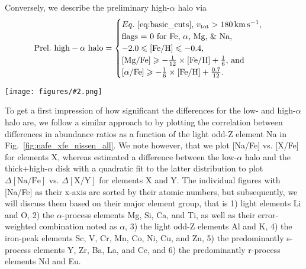 \documentclass[fleqn,usenatbib]{mnras}
\newcommand{\codeicon}{{\faCloudDownload}}
\newcommand{\codelink}[1]{\href{https://github.com/svenbuder/Accreted-stars-in-GALAH-DR3/tree/main/figures/#1.ipynb}{\codeicon}\,\,}
\newcommand{\oscaption}[2]{\caption{#2 \codelink{#1}}}
\newcommand{\figuretextwidth}[4]{\begin{figure*} \centering \texttt{[image: figures/\#2.png]}\oscaption{#3}{#4}\label{fig:#2} \end{figure*}}
\begin{document}
Conversely, we describe the preliminary high-$\alpha$ halo via
\begin{equation} \label{eq:prelim_high_alpha_halo}
\mathrm{Prel.~high-\alpha~halo} =
\begin{cases}
Eq.~\ref{eq:basic_cuts}\text{, } v_\text{tot} > 180\,\mathrm{km\,s^{-1}} \text{, } \\
\text{flags = 0 for Fe, }\alpha\text{, Mg, \& Na, } \\
-2.0 \leq \mathrm{[Fe/H]} \leq -0.4 \text{, }\\
\mathrm{[Mg/Fe]} \geq - \frac{1}{12} \times \mathrm{[Fe/H]} + \frac{1}{6} \text{, and}\\
\mathrm{[\alpha/Fe]} \geq - \frac{1}{6} \times \mathrm{[Fe/H]} + \frac{0.7}{12}.\\
\end{cases}
\end{equation}

\figuretextwidth{17cm}{nafe_xfe_nissen_all}{chemical_differences}{
\textbf{Abundances [X/Fe] for the the 28 elements measured by GALAH in addition to Na and Fe, whose abundance ratio [Na/Fe] is used on the ordinate.} The density distribution of the base sample of GALAH+ DR3 (Eq.~\ref{eq:basic_cuts}) is shown in greyscale. GALAH+ DR3 stars which are preliminary tagged to the low-$\alpha$ halo (via Eq.~\ref{eq:prelim_low_alpha_halo}) are shown in orange.
We also show the data by \citet{Nissen2010} for $\alpha$, Na, Mg, Si, Ca, Ti, Cr, and Ni with red circles for their low-$\alpha$ halo stars, blue open circles for their high-$\alpha$ halo stars and black crossed for their thick disk stars. For the same stars of this study, we plot the data by \citet{Nissen2011} for Mn, Cu, Zn, Y, and Ba, \citet{Nissen2012} for Li (their non-LTE values), \citet{Nissen2014} for O (their non-LTE values based on the $\lambda 7774$ \ion{O}{i} triplet), and \citet{Fishlock2017} for Sc, Zr, La, Ce, Nd, and Eu. Arrows show upper limits coloured by their respective selection.} 

To get a first impression of how significant the differences for the low- and high-$\alpha$ halo are, we follow a similar approach to \citet[][see their Fig.~5]{Nissen2011} by plotting the correlation between differences in abundance ratios as a function of the light odd-Z element Na in Fig.~\ref{fig:nafe_xfe_nissen_all}. We note however, that we plot [Na/Fe] vs. [X/Fe] for elements X, whereas \citet{Nissen2011} estimated a difference between the low-$\alpha$ halo and the thick+high-$\alpha$ disk with a quadratic fit to the latter distribution to plot $\Delta \mathrm{[Na/Fe]}$ vs. $\Delta \mathrm{[X/Y]}$ for elements X and Y. The individual figures with [Na/Fe] as their x-axis are sorted by their atomic numbers, but subsequently, we will discuss them based on their major element group, that is 1) light elements Li and O, 2) the $\alpha$-process elements Mg, Si, Ca, and Ti, as well as their error-weighted combination noted as $\alpha$, 3) the light odd-Z elements Al and K, 4) the iron-peak elements Sc, V, Cr, Mn, Co, Ni, Cu, and Zn, 5) the predominantly s-process elements Y, Zr, Ba, La, and Ce, and 6) the predominantly r-process elements Nd and Eu.
\end{document}
